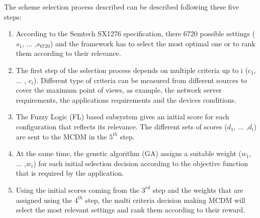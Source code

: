 The scheme selection process described  can be described following these five steps:

\begin{enumerate}
	\item According to the Semtech SX1276 specification\cite{lorasemtech}, there  6720 possible settings ($s_{1}$, ... ,$s_{6720}$) and the framework has to select the most optimal one or to rank them according to their relevance.
	\item The first step of the selection process depends on multiple criteria up to i ($c_{1}$, ... , $c_{i}$).
		Different type of criteria can be measured from different sources to cover the maximum point of views,
		as example,
		the network server requirements, the applications requirements and the devices conditions.
	\item The Fuzzy Logic (FL) based subsystem gives an initial score for each configuration that reflects its relevance.
		The different sets of scores ($d_{1}$, ... ,$d_{i}$) are sent to the \ac{MCDM} in the $5^{th}$ step.
	\item At the same time,
			the genetic algorithm (GA) \cite{alkhawlani_access_2008} assigns a suitable weight ($w_{1}$, ... ,$w_{i}$) for each initial selection decision according to the objective function that is required by the application.
	\item Using the initial scores coming from the $3^{rd}$ step and the weights that are assigned using the $4^{th}$ step,
			the multi criteria decision making{} \ac{MCDM} will select the most relevant settings and rank them according to their reward.
\end{enumerate}

